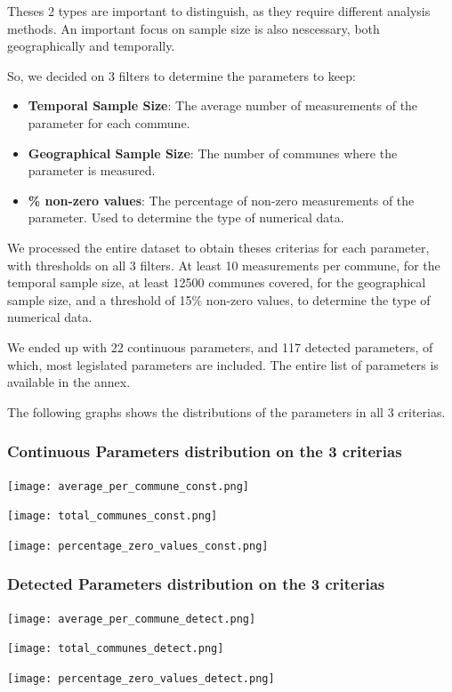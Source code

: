 \documentclass{article}
\begin{document}
Theses 2 types are important to distinguish, as they require different analysis methods.
An important focus on sample size is also nescessary, both geographically and temporally.

So, we decided on 3 filters to determine the parameters to keep:
\begin{itemize}
    \item \textbf{Temporal Sample Size}: The average number of measurements of the parameter for each commune.
    \item \textbf{Geographical Sample Size}: The number of communes where the parameter is measured.
    \item \textbf{\% non-zero values}: The percentage of non-zero measurements of the parameter. Used to determine the type of numerical data.
\end{itemize}

We processed the entire dataset to obtain theses criterias for each parameter, with thresholds on all 3 filters. At least 10 measurements per commune, for the temporal sample size, at least 12500 communes covered, for the geographical sample size, and a threshold of 15\% non-zero values, to determine the type of numerical data.

We ended up with 22 continuous parameters, and 117 detected parameters, of which, most legislated parameters are included.
The entire list of parameters is available in the annex.

The following graphs shows the distributions of the parameters in all 3 criterias.
\newpage
\subsubsection*{Continuous Parameters distribution on the 3 criterias}

\begin{center}
    \centerline{\texttt{[image: average\_per\_commune\_const.png]}}
    \centerline{\texttt{[image: total\_communes\_const.png]}}
    \centerline{\texttt{[image: percentage\_zero\_values\_const.png]}}
\end{center}


\newpage
\subsubsection*{Detected Parameters distribution on the 3 criterias}

\begin{center}
    \centerline{\texttt{[image: average\_per\_commune\_detect.png]}}
    \centerline{\texttt{[image: total\_communes\_detect.png]}}
    \centerline{\texttt{[image: percentage\_zero\_values\_detect.png]}}
\end{center}
\end{document}
